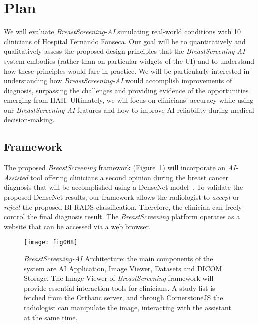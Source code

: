 \section{Plan}
\label{sec:sec004}

We will evaluate {\it BreastScreening-AI} simulating real-world conditions with 10 clinicians of \hyperlink{https://hff.min-saude.pt/}{Hospital Fernando Fonseca}.
Our goal will be to quantitatively and qualitatively assess the proposed design principles that the {\it BreastScreening-AI} system embodies (rather than on particular widgets of the UI) and to understand how these principles would fare in practice.
We will be particularly interested in understanding how {\it BreastScreening-AI} would accomplish improvements of diagnosis, surpassing the challenges and providing evidence of the opportunities emerging from HAII.
Ultimately, we will focus on clinicians' accuracy while using our {\it BreastScreening-AI} features and how to improve AI reliability during medical decision-making.

\subsection{Framework}
\label{sec:sec00401}

The proposed {\it BreastScreening} framework (Figure~\ref{fig:fig008}) will incorporate an {\it AI-Assisted} tool offering clinicians a second opinion during the breast cancer diagnosis that will be accomplished using a DenseNet model~\cite{chen2019learning}.
To validate the proposed DenseNet results, our framework allows the radiologist to {\it accept} or {\it reject} the proposed BI-RADS classification.
Therefore, the clinician can freely control the final diagnosis result.
The {\it BreastScreening} platform operates as a website that can be accessed via a web browser.


\begin{figure}[h]
\centering
\texttt{[image: fig008]}
\caption{{\it BreastScreening-AI} Architecture: the main components of the system are AI Application, Image Viewer, Datasets and DICOM Storage. The Image Viewer of {\it BreastScreening} framework will provide essential interaction tools for clinicians. A study list is fetched from the Orthanc server, and through CornerstoneJS the radiologist can manipulate the image, interacting with the assistant at the same time.}
\label{fig:fig008}
\end{figure}

